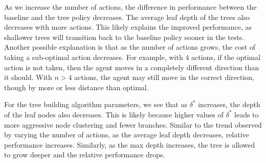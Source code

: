 \documentclass[letterpaper]{article} %
\begin{document}
As we increase the number of actions, the difference in performance between the baseline and the tree policy decreases. 
The average leaf depth of the trees also decreases with more actions. 
This likely explains the improved performance, as shallower trees will transition back to the baseline policy sooner in the tests. 
Another possible explanation is that as the number of actions grows, the cost of taking a sub-optimal action decreases. 
For example, with $4$ actions, if the optimal action is not taken, then the agent moves in a completely different direction than it should.
With $n>4$ actions, the agent may still move in the correct direction, though by more or less distance than optimal.

For the tree building algorithm parameters, we see that as $\delta^*$ increases, the depth of the leaf nodes also decreases. 
This is likely because higher values of $\delta^*$ leads to more aggressive node clustering and fewer branches. 
Similar to the trend observed by varying the number of actions, as the average leaf depth decreases, relative performance increases. 
Similarly, as the max depth increases, the tree is allowed to grow deeper and the relative performance drops. 
\end{document}
